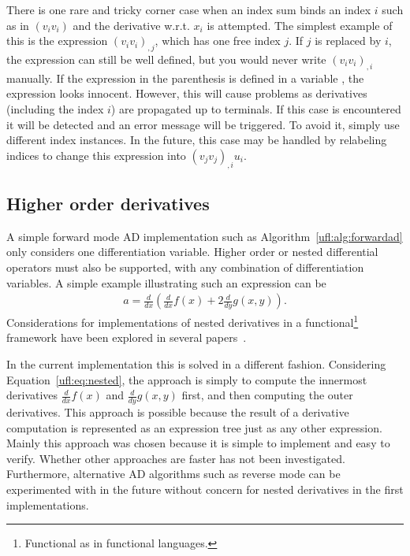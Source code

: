 There is one rare and tricky corner case when an index sum binds an
index $i$ such as in $(v_i v_i)$ and the derivative w.r.t. $x_i$ is
attempted.  The simplest example of this is the expression $(v_i
v_i)_{,j}$, which has one free index $j$.  If $j$ is replaced by $i$,
the expression can still be well defined, but you would never write
$(v_i v_i)_{,i}$ manually.  If the expression in the parenthesis is
defined in a variable , the expression
 looks innocent. However, this will cause problems as
derivatives (including the index $i$) are propagated up to terminals.
If this case is encountered it will be detected and an error message
will be triggered.  To avoid it, simply use different index instances.
In the future, this case may be handled by relabeling indices to
change this expression into $(v_j v_j)_{,i}u_i$.

\subsection{Higher order derivatives}
A simple forward mode AD implementation such as
Algorithm~\ref{ufl:alg:forwardad} only considers one differentiation
variable.  Higher order or nested differential operators must also be
supported, with any combination of differentiation variables.  A
simple example illustrating such an expression can be
\begin{align} \label{ufl:eq:nested}
a = \frac{d}{dx}\left( \frac{d}{dx} f(x) + 2 \frac{d}{dy} g(x,y) \right) .
\end{align}
Considerations for implementations of nested derivatives
in a functional\footnote{Functional as in functional languages.}
framework have been explored in several
papers~\cite{Kar2001,PeaSis2007,SisPea2008}.

In the current \ufl{} implementation this is solved in a different
fashion.  Considering Equation~\eqref{ufl:eq:nested}, the approach is
simply to compute the innermost derivatives $\frac{d}{dx} f(x)$ and
$\frac{d}{dy} g(x,y)$ first, and then computing the outer derivatives.
This approach is possible because the result of a derivative
computation is represented as an expression tree just as any other
expression.  Mainly this approach was chosen because it is simple to
implement and easy to verify.  Whether other approaches are faster has
not been investigated.  Furthermore, alternative AD algorithms such as
reverse mode can be experimented with in the future without concern
for nested derivatives in the first implementations.

